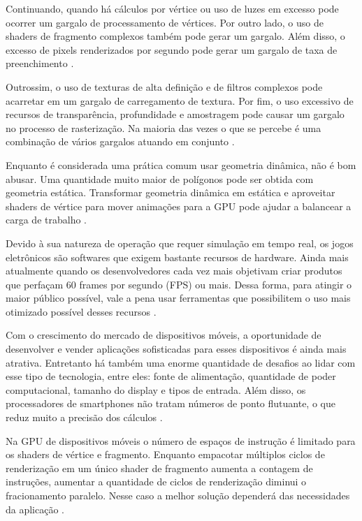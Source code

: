Continuando, quando há cálculos por vértice ou uso de luzes em excesso pode ocorrer um gargalo de processamento de vértices. Por outro lado, o uso de shaders de fragmento complexos também pode gerar um gargalo. Além disso, o excesso de pixels renderizados por segundo pode gerar um gargalo de taxa de preenchimento \cite{riguer2002performance}.

Outrossim, o uso de texturas de alta definição e de filtros complexos pode acarretar em um gargalo de carregamento de textura. Por fim, o uso excessivo de recursos de transparência, profundidade e amostragem pode causar um gargalo no processo de rasterização. Na maioria das vezes o que se percebe é uma combinação de vários gargalos atuando em conjunto \cite{riguer2002performance}. 

Enquanto é considerada uma prática comum usar geometria dinâmica, não é bom abusar. Uma quantidade muito maior de polígonos pode ser obtida com geometria estática. Transformar geometria dinâmica em estática e aproveitar shaders de vértice para mover animações para a GPU pode ajudar a balancear a carga de trabalho \cite{riguer2002performance}. 

Devido à sua natureza de operação que requer simulação em tempo real, os jogos eletrônicos são softwares que exigem bastante recursos de hardware. Ainda mais atualmente quando os desenvolvedores cada vez mais objetivam criar produtos que perfaçam 60 frames por segundo (FPS) ou mais. Dessa forma, para atingir o maior público possível, vale a pena usar ferramentas que possibilitem o uso mais otimizado possível desses recursos \cite{comparacaoDesempenho}.

Com o crescimento do mercado de dispositivos móveis, a oportunidade de desenvolver e vender aplicações sofisticadas para esses dispositivos é ainda mais atrativa. Entretanto há também uma enorme quantidade de desafios ao lidar com esse tipo de tecnologia, entre eles: fonte de alimentação, quantidade de poder computacional, tamanho do display e tipos de entrada. Além disso, os processadores de smartphones não tratam números de ponto flutuante, o que reduz muito a precisão dos cálculos \cite{optimizationMobile}.

Na GPU de dispositivos móveis o número de espaços de instrução é limitado para os shaders de vértice e fragmento. Enquanto empacotar múltiplos ciclos de renderização em um único shader de fragmento aumenta a contagem de instruções, aumentar a quantidade de ciclos de renderização diminui o fracionamento paralelo. Nesse caso a melhor solução dependerá das necessidades da aplicação \cite{designMobileGPU}. 


